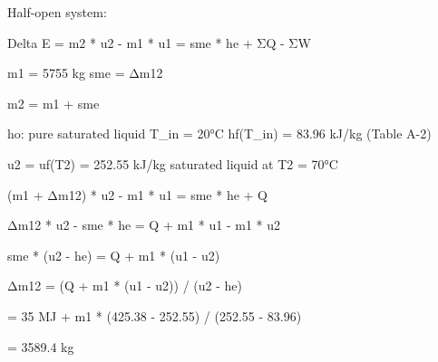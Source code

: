 Half-open system:  

Delta E = m2 * u2 - m1 * u1 = sme * he + ΣQ - ΣW  

m1 = 5755 kg  
sme = Δm12  

m2 = m1 + sme  

ho: pure saturated liquid  
T_in = 20°C  
hf(T_in) = 83.96 kJ/kg (Table A-2)  

u2 = uf(T2) = 252.55 kJ/kg  
saturated liquid at T2 = 70°C  

(m1 + Δm12) * u2 - m1 * u1 = sme * he + Q  

Δm12 * u2 - sme * he = Q + m1 * u1 - m1 * u2  

sme * (u2 - he) = Q + m1 * (u1 - u2)  

Δm12 = (Q + m1 * (u1 - u2)) / (u2 - he)  

= 35 MJ + m1 * (425.38 - 252.55) / (252.55 - 83.96)  

= 3589.4 kg
